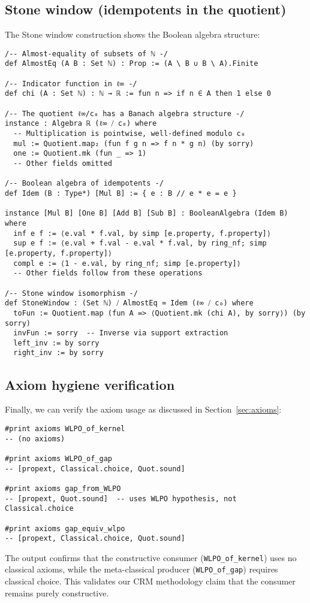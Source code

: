 \documentclass[11pt]{article}
\begin{document}
\subsection{Stone window (idempotents in the quotient)}

The Stone window construction shows the Boolean algebra structure:

\begin{lstlisting}[caption={Stone window: Boolean algebra of idempotents},label={lst:stone}]
/-- Almost-equality of subsets of ℕ -/
def AlmostEq (A B : Set ℕ) : Prop := (A \ B ∪ B \ A).Finite

/-- Indicator function in ℓ∞ -/
def chi (A : Set ℕ) : ℕ → ℝ := fun n => if n ∈ A then 1 else 0

/-- The quotient ℓ∞/c₀ has a Banach algebra structure -/
instance : Algebra ℝ (ℓ∞ ⧸ c₀) where
  -- Multiplication is pointwise, well-defined modulo c₀
  mul := Quotient.map₂ (fun f g n => f n * g n) (by sorry)
  one := Quotient.mk (fun _ => 1)
  -- Other fields omitted

/-- Boolean algebra of idempotents -/
def Idem (B : Type*) [Mul B] := { e : B // e * e = e }

instance [Mul B] [One B] [Add B] [Sub B] : BooleanAlgebra (Idem B) where
  inf e f := ⟨e.val * f.val, by simp [e.property, f.property]⟩
  sup e f := ⟨e.val + f.val - e.val * f.val, by ring_nf; simp [e.property, f.property]⟩
  compl e := ⟨1 - e.val, by ring_nf; simp [e.property]⟩
  -- Other fields follow from these operations

/-- Stone window isomorphism -/
def StoneWindow : (Set ℕ) ⧸ AlmostEq ≃ Idem (ℓ∞ ⧸ c₀) where
  toFun := Quotient.map (fun A => ⟨Quotient.mk (chi A), by sorry⟩) (by sorry)
  invFun := sorry  -- Inverse via support extraction
  left_inv := by sorry
  right_inv := by sorry
\end{lstlisting}

\subsection{Axiom hygiene verification}

Finally, we can verify the axiom usage as discussed in Section~\ref{sec:axioms}:

\begin{lstlisting}[caption={Axiom audit commands},label={lst:axioms}]
#print axioms WLPO_of_kernel
-- (no axioms)

#print axioms WLPO_of_gap  
-- [propext, Classical.choice, Quot.sound]

#print axioms gap_from_WLPO
-- [propext, Quot.sound]  -- uses WLPO hypothesis, not Classical.choice

#print axioms gap_equiv_wlpo
-- [propext, Classical.choice, Quot.sound]
\end{lstlisting}

The output confirms that the constructive consumer (\texttt{WLPO\_of\_kernel}) uses no classical axioms, while the meta-classical producer (\texttt{WLPO\_of\_gap}) requires classical choice. This validates our CRM methodology claim that the consumer remains purely constructive.
\end{document}
